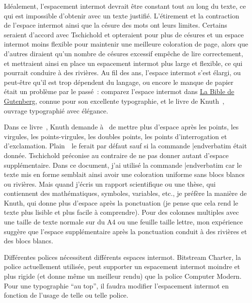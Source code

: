 Id\'ealement, l'espacement intermot devrait \^etre constant tout au long du texte, ce qui est impossible d'obtenir avec un texte justifi\'e. L'\'etirement et la contraction de l'espace intermot ainsi que la c\'esure des mots ont leurs limites. Certains seraient d'accord avec Tschichold et opteraient pour plus de c\'esures et un espace intermot moins flexible pour maintenir une meilleure coloration de page, alors que d'autres diraient qu'un nombre de c\'esures excessif emp\^eche de lire correctement, et mettraient ainsi en place un espacement intermot plus large et flexible, ce qui pourrait conduire \`a des rivi\`eres. Au fil des ans, l'espace intermot s'est \'elargi, ou peut-\^etre qu'il est trop d\'ependent du langage, ou encore le manque de papier \'etait un probl\`eme par le pass\'e~: comparez l'espace intermot dans \href{http://burton.byu.edu/Bible\%20Site/Gutenberg.htm}{La Bible de Gutenberg}, connue pour son excellente typographie, et le livre de Knuth~\cite{knuth_texbook}, ouvrage typographi\'e avec \'el\'egance.

Dans ce livre~\cite{knuth_texbook}, Knuth demande \`a \capstex\ de mettre plus d'espace apr\`es les points, les virgules, les points-virgules, les doubles points, les points d'interrogation et d'exclamation. Plain~\capstex\ le ferait par d\'efaut sauf si la commande {\color{brown}\verbatim \frenchspacing|endverbatim} \'etait donn\'ee. Tschichold pr\'econise au contraire de ne pas donner autant d'espace suppl\'ementaire. Dans ce document, j'ai utilis\'e la commande {\color{brown}\verbatim \frenchspacing|endverbatim} car le texte mis en forme semblait ainsi avoir une coloration uniforme sans blocs blancs ou rivi\`eres. Mais quand j'\'ecris un rapport scientifique ou une th\`ese, qui contiennent des math\'ematiques, symboles, variables, etc., je pr\'ef\`ere la mani\`ere de Knuth, qui donne plus d'espace apr\`es la ponctuation (je pense que cela rend le texte plus lisible et plus facile \`a comprendre). Pour des colonnes multiples avec une taille de texte normale sur du A4 ou une feuille taille lettre, mon exp\'erience sugg\`ere que l'espace suppl\'ementaire apr\`es la ponctuation conduit \`a des rivi\`eres et des blocs blancs.

Diff\'erentes polices n\'ecessitent diff\'erents espaces intermot. Bitstream Charter, la police actuel\-le\-ment utilis\'ee, peut supporter un espacement intermot moindre et plus rigide (et donne m\^eme un meilleur rendu) que la police Computer Modern. Pour une typographie ``au top'', il faudra modifier l'espacement intermot en fonction de l'usage de telle ou telle police.

